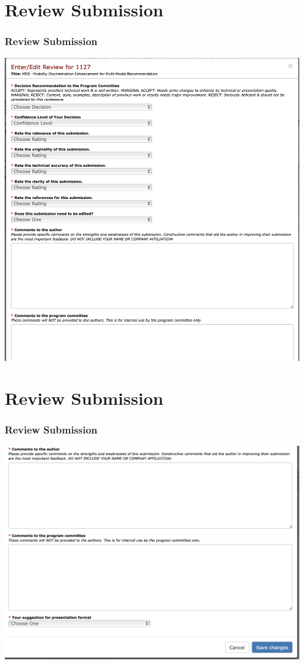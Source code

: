 \documentclass{beamer}
\begin{document}
\section*{Review Submission}
\begin{frame}
  \frametitle{Review Submission}
  \bigskip
  \includegraphics[width=1.0\textwidth]{ReviewSub02.png}
  \bigskip
\end{frame}




\section*{Review Submission}
\begin{frame}
  \frametitle{Review Submission}
  \bigskip
  \includegraphics[width=1.0\textwidth]{ReviewSub01.png}
  \bigskip
\end{frame}
\end{document}
